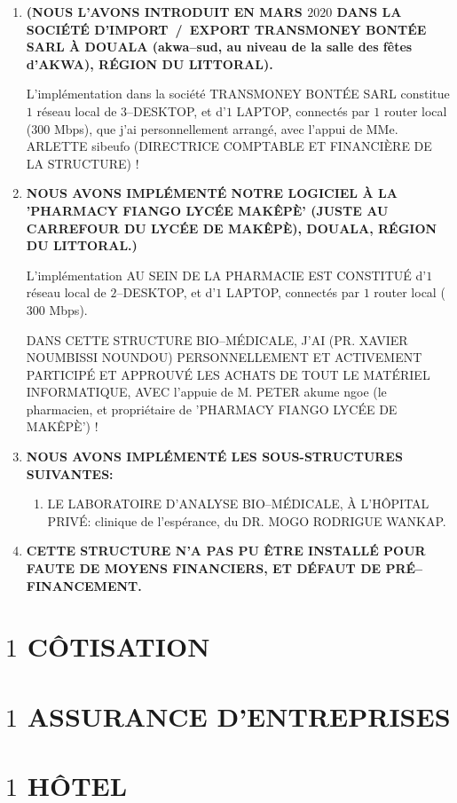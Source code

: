\begin{enumerate}[1.]
	\itemsep 0.75em
	\item {}
	 
		\textbf{(NOUS L'AVONS INTRODUIT EN MARS $2020$ DANS
		LA SOCI\'ET\'E D'IMPORT~/~EXPORT TRANSMONEY BONT\'EE SARL
		\`A DOUALA (akwa--sud, au niveau de la salle des f\^etes
		d'AKWA), R\'EGION DU LITTORAL).}
		
		L'implémentation dans la société TRANSMONEY BONTÉE SARL
		constitue $1$ réseau local de $3$--DESKTOP, et d'$1$ LAPTOP,
		connectés par $1$ router local ($300$ Mbps), que j'ai personnellement
		arrangé, avec l'appui de MMe. ARLETTE sibeufo (DIRECTRICE COMPTABLE
		ET FINANCIÈRE DE LA STRUCTURE) !
				
	\item {}
	
		\textbf{NOUS AVONS IMPL\'EMENT\'E NOTRE LOGICIEL \`A LA
		'PHARMACY FIANGO LYC\'EE MAK\^EP\`E' (JUSTE AU CARREFOUR
		DU LYC\'EE DE MAK\^EP\`E), DOUALA, R\'EGION DU LITTORAL.)}
		
		L'implémentation AU SEIN DE LA PHARMACIE EST CONSTITUÉ
		d'$1$ réseau local de $2$--DESKTOP, et d'$1$ LAPTOP,
		connectés par $1$ router local ($300$ Mbps).
		
		DANS CETTE STRUCTURE BIO--MÉDICALE, J'AI (PR. XAVIER NOUMBISSI
		NOUNDOU) PERSONNELLEMENT ET ACTIVEMENT PARTICIPÉ ET APPROUVÉ
		LES ACHATS DE TOUT LE MATÉRIEL INFORMATIQUE, AVEC l'appuie
		de M. PETER akume ngoe (le pharmacien, et propriétaire de
		'PHARMACY FIANGO LYCÉE DE MAKÊPÈ') !

	\item {}
	
		\textbf{NOUS AVONS IMPLÉMENTÉ LES SOUS-STRUCTURES SUIVANTES:}
		\begin{enumerate}[1.]
				\item LE LABORATOIRE D'ANALYSE BIO--MÉDICALE, À
				L'HÔPITAL PRIVÉ: clinique de l'espérance, du 
				DR. MOGO RODRIGUE WANKAP.
		\end{enumerate}

	\item {}	
	
		\textbf{CETTE STRUCTURE N'A PAS PU ÊTRE INSTALLÉ POUR
		FAUTE DE MOYENS FINANCIERS, ET DÉFAUT DE PRÉ--FINANCEMENT.}
	
\end{enumerate}



\section{$1$ CÔTISATION}



\section{$1$ ASSURANCE D'ENTREPRISES}



\section{$1$ HÔTEL}


